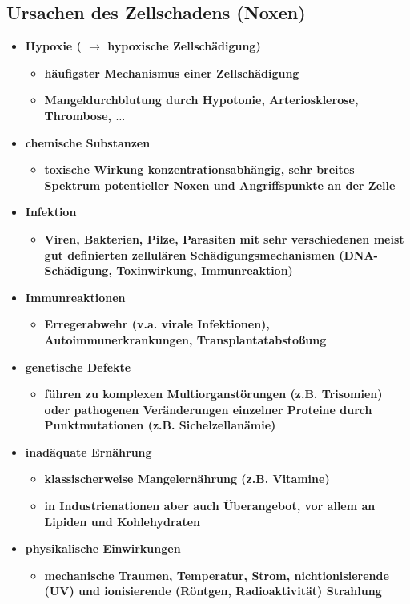 \subsection{Ursachen des Zellschadens (Noxen)}
	\begin{itemize}
		\item \textbf{Hypoxie ( $\rightarrow$  hypoxische Zellschädigung)}
			\begin{itemize}
				\item \textbf{häufigster Mechanismus einer Zellschädigung}
				\item \textbf{Mangeldurchblutung durch Hypotonie, Arteriosklerose, Thrombose, $\dots$}
			\end{itemize}
		\item \textbf{chemische Substanzen}
			\begin{itemize}
				\item \textbf{toxische Wirkung konzentrationsabhängig, sehr breites Spektrum potentieller Noxen und Angriffspunkte an der Zelle}
			\end{itemize}
		\item \textbf{Infektion}
			\begin{itemize}
				\item \textbf{Viren, Bakterien, Pilze, Parasiten mit sehr verschiedenen meist gut definierten zellulären Schädigungsmechanismen (DNA-Schädigung, Toxinwirkung, Immunreaktion)}
			\end{itemize}
		\item \textbf{Immunreaktionen}
			\begin{itemize}
				\item \textbf{Erregerabwehr (v.a. virale Infektionen), Autoimmunerkrankungen, Transplantatabstoßung}
			\end{itemize}
		\item \textbf{genetische Defekte}
			\begin{itemize}
				\item \textbf{führen zu komplexen Multiorganstörungen (z.B. Trisomien)  oder pathogenen Veränderungen einzelner Proteine durch Punktmutationen (z.B. Sichelzellanämie)}
			\end{itemize}
		\item \textbf{inadäquate Ernährung}
			\begin{itemize}
				\item \textbf{klassischerweise Mangelernährung (z.B. Vitamine)}
				\item \textbf{in Industrienationen aber auch Überangebot, vor allem an Lipiden und Kohlehydraten}
			\end{itemize}
		\item \textbf{physikalische Einwirkungen}
			\begin{itemize}
				\item \textbf{mechanische Traumen, Temperatur, Strom,  nichtionisierende (UV) und ionisierende (Röntgen, Radioaktivität) Strahlung}
			\end{itemize}
	\end{itemize}

